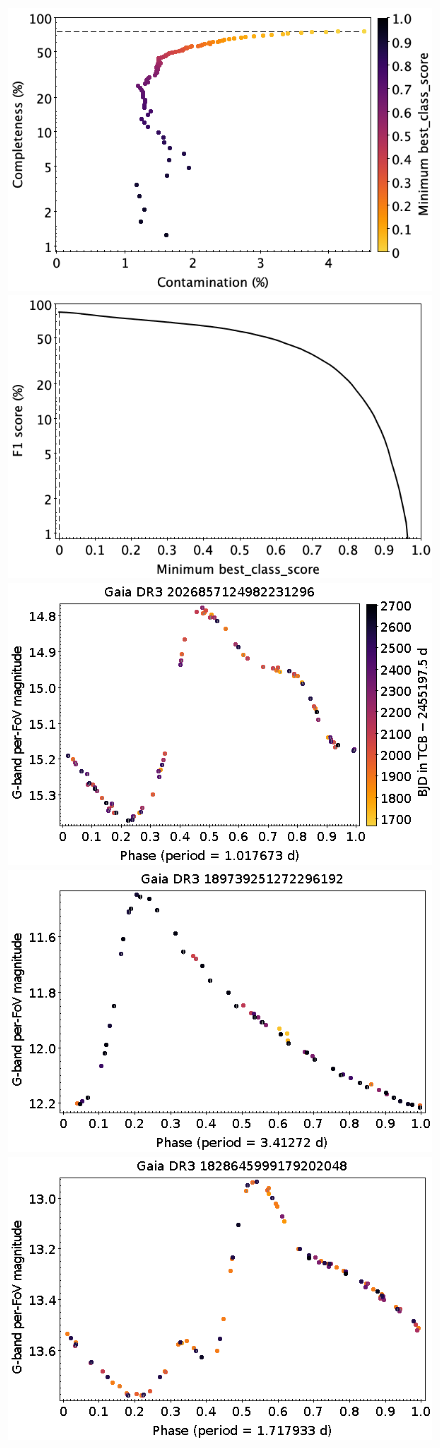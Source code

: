 \documentclass[longauth]{aa}
\begin{document}
\begin{appendix}
\begin{figure}
\centering
{} \includegraphics[width=0.45\hsize]{figures/appendix/CEP_cls_scc.png}  
\hspace{2mm}
 \includegraphics[width=0.45\hsize]{figures/appendix/CEP_cls_sf1.png} \\ 
\vspace{4mm}
 \includegraphics[width=0.45\hsize]{figures/appendix/ACEP_FUNDAMENTAL-5.png}  
\hspace{2mm}
 \includegraphics[width=0.45\hsize]{figures/appendix/DCEP_FUNDAMENTAL-47.png} \\
\vspace{4mm}
 \includegraphics[width=0.45\hsize]{figures/appendix/BL_HER-11.png}  

\end{figure}
\end{appendix}
\end{document}
